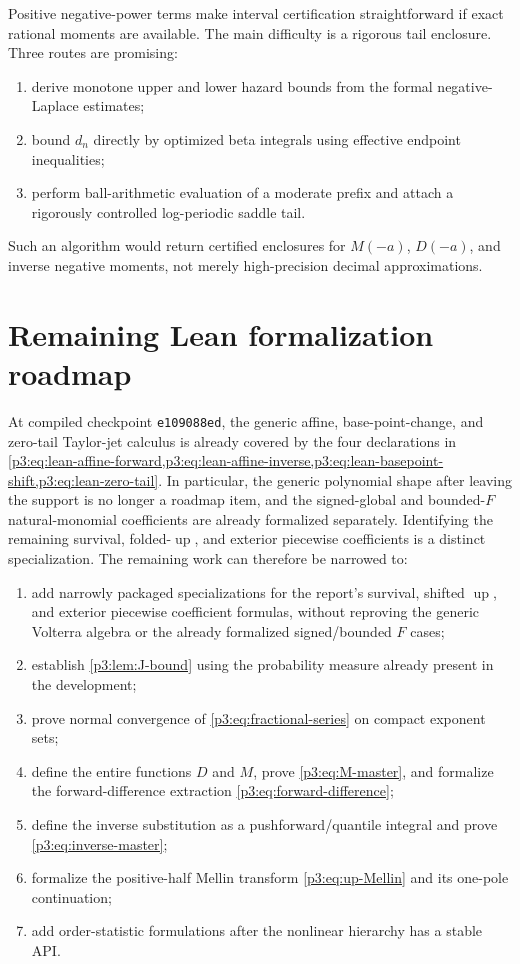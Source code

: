 \documentclass[11pt,oneside]{article}
\theoremstyle{definition}
\theoremstyle{remark}
\newcommand{\Up}{\operatorname{up}}
\newcommand{\1}{\mathbf 1}
\begin{document}
Positive negative-power terms make interval certification straightforward if exact rational
moments are available.  The main difficulty is a rigorous tail enclosure.  Three routes are
promising:

\begin{enumerate}
\item derive monotone upper and lower hazard bounds from the formal negative-Laplace estimates;
\item bound $d_n$ directly by optimized beta integrals using effective endpoint inequalities;
\item perform ball-arithmetic evaluation of a moderate prefix and attach a rigorously
      controlled log-periodic saddle tail.
\end{enumerate}

Such an algorithm would return certified enclosures for $M(-a)$, $D(-a)$, and inverse
negative moments, not merely high-precision decimal approximations.

\section{Remaining Lean formalization roadmap}
\label{p3:sec:lean}

At compiled checkpoint \texttt{e109088ed}, the generic affine, base-point-change, and
zero-tail Taylor-jet calculus is already covered by the four declarations in
\cref{p3:eq:lean-affine-forward,p3:eq:lean-affine-inverse,p3:eq:lean-basepoint-shift,p3:eq:lean-zero-tail}.
In particular, the generic polynomial shape after leaving the support is no longer a
roadmap item, and the signed-global and bounded-$F$ natural-monomial coefficients are
already formalized separately.  Identifying the remaining survival, folded-\(\Up\), and
exterior piecewise coefficients is a distinct specialization.  The remaining work can
therefore be narrowed to:

\begin{enumerate}
\item add narrowly packaged specializations for the report's survival, shifted $\Up$, and
      exterior piecewise coefficient formulas, without reproving the generic Volterra
      algebra or the already formalized signed/bounded $F$ cases;
\item establish \cref{p3:lem:J-bound} using the probability measure already present in the
      development;
\item prove normal convergence of \eqref{p3:eq:fractional-series} on compact exponent sets;
\item define the entire functions $D$ and $M$, prove \eqref{p3:eq:M-master}, and formalize the
      forward-difference extraction \eqref{p3:eq:forward-difference};
\item define the inverse substitution as a pushforward/quantile integral and prove
      \eqref{p3:eq:inverse-master};
\item formalize the positive-half Mellin transform \eqref{p3:eq:up-Mellin} and its one-pole
      continuation;
\item add order-statistic formulations after the nonlinear hierarchy has a stable API.
\end{enumerate}
\end{document}
